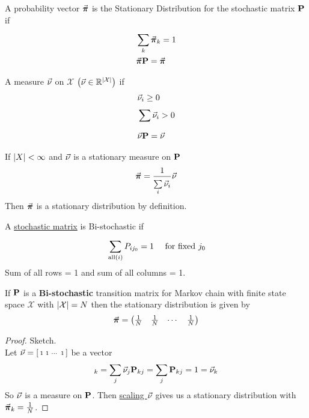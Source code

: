\documentclass[12pt,a4paper]{article}
\begin{document}
\begin{defn}
A probability vector $\va*{\pi}$ is the Stationary Distribution for the stochastic matrix $\vb{P}$ if 
\begin{align*}
&\sum\limits_{k}^{}\va*\pi_k = 1\\
&\va*{\pi}\vb{P} = \va*{\pi}
\end{align*}
\end{defn}
\begin{defn}
A measure $\va\nu$ on $\mathcal{X}$ $\left(\va\nu \in \mathbb{R}^{\abs{\mathcal{X}}}\right)$ if 
\begin{align*}
&\va \nu_i \geq 0\\
&\sum\limits_{}^{}\va\nu_i > 0\\
&\va\nu \vb{P} = \va\nu
\end{align*}
\end{defn}
\begin{prop}
\label{statdm}
If $\abs{X} < \infty$ and $\va\nu$ is a stationary measure on $\vb P$  
\begin{align*}
\va*\pi = \frac{1}{\sum\limits_{i}^{}\va\nu_i}\va\nu
\end{align*}
Then $\va*\pi$ is a stationary distribution by definition.
\end{prop}
\newpage
\begin{defn}
A \hyperref[stocmat]{stochastic matrix} is Bi-stochastic if 
\begin{align*}
&\sum\limits_{\mathrm{all}(i)}^{}P_{ij_0} = 1 & \text{ for fixed $j_0$}
\end{align*}
Sum of all rows = 1 and sum of all columns = 1.   
\end{defn}

\begin{prop}
If $\vb P$ is a \textbf{Bi-stochastic} transition matrix for Markov chain with finite state space $\mathcal{X}$ with $\abs{\mathcal{X}} = N$ then the stationary distribution is given by 
\begin{align*}
\va*\pi = \mqty(\frac{1}{N} & \frac{1}{N} & \cdots & \frac{1}{N})
\end{align*}
\end{prop}
\begin{proof}
Sketch. \\
Let $\va\nu = \smqty[1 & 1 & \cdots & 1]$ be a vector
\begin{align*}
[\va\nu \vb P]_k = \sum_{j} \va\nu_j \vb P_{kj} = \sum_{j} \vb P_{kj} = 1 = \va\nu_k
\end{align*}
So $\va\nu$ is a measure on $\vb P$. Then \hyperref[statdm]{scaling $\va\nu$} gives us a stationary distribution with $\va*\pi_k = \frac{1}{N}$.
\end{proof}
\end{document}
